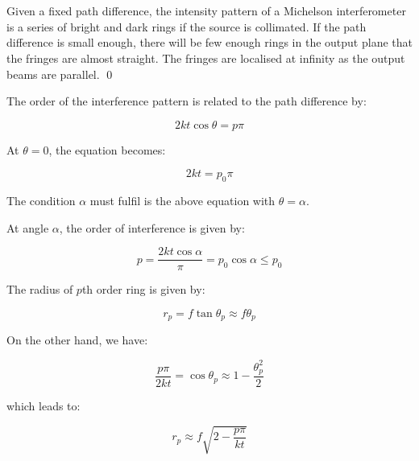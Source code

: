 \documentclass[12pt]{article}
\begin{document}



\pagebreak
\section*{}


Given a fixed path difference, the intensity pattern of a Michelson interferometer is a series of bright and dark rings if the source is collimated. If the path difference is small enough, there will be few enough rings in the output plane that the fringes are almost straight. The fringes are localised at infinity as the output beams are parallel.
\qed



The order of the interference pattern is related to the path difference by:

\begin{equation}
    2kt\cos{\theta} = p \pi
\end{equation}

At $\theta = 0$, the equation becomes:

\begin{equation}
    2kt = p_{0} \pi
\end{equation}

The condition $\alpha$ must fulfil is the above equation with $\theta = \alpha$.

At angle $\alpha$, the order of interference is given by:

\begin{equation}
    p = \frac{2kt\cos{\alpha}}{\pi} = p_{0} \cos{\alpha} \le p_{0}
\end{equation}

The radius of $p$th order ring is given by:

\begin{equation}
    r_{p} = f \tan{\theta_{p}} \approx f \theta_{p}
\end{equation}

On the other hand, we have:

\begin{equation}
    \frac{p \pi}{2kt} = \cos{\theta_{p}} \approx 1 - \frac{\theta_{p}^{2}}{2}
\end{equation}

which leads to:

\begin{equation}
    r_{p} \approx f \sqrt{2 - \frac{p\pi}{kt}}
\end{equation}
\end{document}
